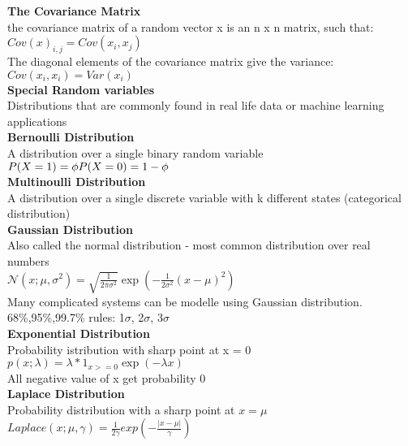 \documentclass{article}
\begin{document}
\textbf{The Covariance Matrix}\\
the covariance matrix of a random vector x is an n x n matrix, such that:\\
$Cov(x)_{i,j} = Cov(x_i,x_j)$\\
The diagonal elements of the covariance matrix give the variance:\\
$Cov(x_i,x_i) = Var(x_i)$\\
\newline
\textbf{Special Random variables}\\
Distributions that are commonly found in real life data or machine learning applications\\
\textbf{Bernoulli Distribution}\\
A distribution over a single binary random variable\\
\begin{math}
    P(X = 1) = \phi\\
    P(X = 0) = 1 - \phi
\end{math}\\
\textbf{Multinoulli Distribution}\\
A distribution over a single discrete variable with k different states (categorical distribution)\\
\textbf{Gaussian Distribution}\\
Also called the normal distribution - most common distribution over real numbers\\
$\mathcal{N}(x;\mu,\sigma^2) = \sqrt{\frac{1}{2\pi\sigma^2}}\exp(-\frac{1}{2\sigma^2}(x-\mu)^2)$\\
Many complicated systems can be modelle using Gaussian distribution.\\
68\%,95\%,99.7\% rules: 1$\sigma$, 2$\sigma$, 3$\sigma$\\
\textbf{Exponential Distribution}\\
Probability istribution with sharp point at x = 0\\
$p(x;\lambda) = \lambda * 1_{x>=0}\exp(-\lambda x)$\\
All negative value of x get probability 0\\
\textbf{Laplace Distribution}\\
Probability distribution with a sharp point at $x=\mu$\\
$Laplace(x;\mu,\gamma) = \frac{1}{2\gamma}exp(-\frac{|x-\mu|}{\gamma})$
\end{document}
